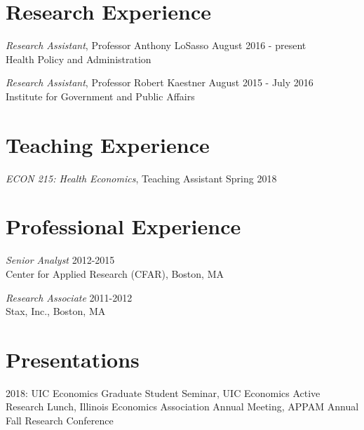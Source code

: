 \documentclass[margin, 10pt]{res} %
\begin{document}
\begin{resume}
\section{Research Experience}

{\sl Research Assistant}, Professor Anthony LoSasso \hfill August 2016 - present \\
Health Policy and Administration
 
{\sl Research Assistant}, Professor Robert Kaestner \hfill August 2015 - July 2016 \\
Institute for Government and Public Affairs 

 
\section{Teaching Experience}

{\sl ECON 215: Health Economics}, Teaching Assistant \hfill Spring 2018 


 
\section{Professional Experience}

{\sl Senior Analyst} \hfill 2012-2015 \\
Center for Applied Research (CFAR), Boston, MA

{\sl Research Associate} \hfill 2011-2012 \\
Stax, Inc., Boston, MA


\section{Presentations}
2018: UIC Economics Graduate Student Seminar, UIC Economics Active Research Lunch, Illinois Economics Association Annual Meeting, APPAM Annual Fall Research Conference


\end{resume}
\end{document}

